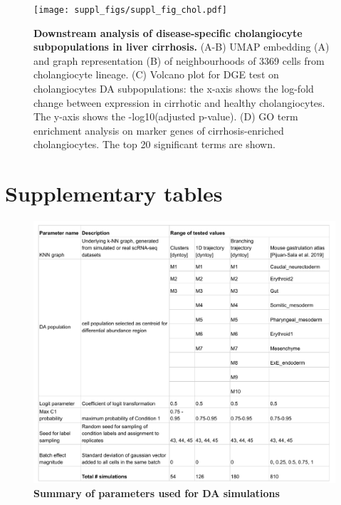 \documentclass[
]{article}
\begin{document}
\begin{figure}
\centering
\texttt{[image: suppl\_figs/suppl\_fig\_chol.pdf]}
\caption{\label{fig:sup-fig-liver-chol}\textbf{Downstream analysis of disease-specific cholangiocyte subpopulations in liver cirrhosis.}
(A-B) UMAP embedding (A) and graph representation (B) of neighbourhoods of 3369 cells from cholangiocyte lineage.
(C) Volcano plot for DGE test on cholangiocytes DA subpopulations: the x-axis shows the log-fold change between expression in cirrhotic and healthy cholangiocytes. The y-axis shows the -log10(adjusted p-value).
(D) GO term enrichment analysis on marker genes of cirrhosis-enriched cholangiocytes. The top 20 significant terms are shown.}
\end{figure}






\newpage

\hypertarget{supplementary-tables}{%
\section*{Supplementary tables}\label{supplementary-tables}}

\renewcommand{\figurename}{Supplementary Table}
\setcounter{figure}{0}

\begin{figure}
\centering
\includegraphics{suppl_tables/table_simulation_params.pdf}
\caption{\label{fig:sup-tab-2}\textbf{Summary of parameters used for DA simulations}}
\end{figure}
\end{document}
